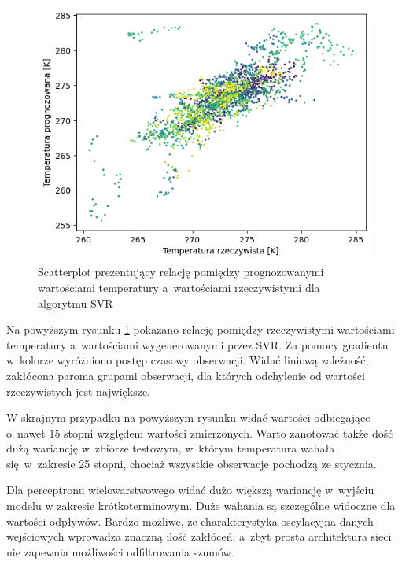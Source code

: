 \begin{figure}[H]
    \centering
    \includegraphics[width=\textwidth]{images/svr_real.png}
    \caption[Scatterplot dla SVR]{Scatterplot prezentujący relację pomiędzy prognozowanymi wartościami
    temperatury a~wartościami rzeczywistymi dla algorytmu SVR}
    \label{svr-real}
\end{figure}

Na powyższym rysunku \ref{svr-real} pokazano relację pomiędzy rzeczywistymi wartościami
temperatury a~wartościami wygenerowanymi przez SVR. Za pomocy gradientu w~kolorze wyróżniono postęp
czasowy obserwacji. Widać liniową zależność, zakłócona paroma grupami obserwacji, dla których
odchylenie od wartości rzeczywistych jest największe.

W skrajnym przypadku na powyższym rysunku widać wartości odbiegające o~nawet 15 stopni względem
wartości zmierzonych. Warto zanotować także dość dużą wariancję w~zbiorze testowym, w~którym
temperatura wahała się w~zakresie 25 stopni, chociaż wszystkie obserwacje pochodzą ze stycznia.

\pagebreak

Dla perceptronu wielowarstwowego widać dużo większą wariancję w~wyjściu modelu 
w zakresie krótkoterminowym. Duże wahania są szczególne widoczne dla wartości odpływów.
Bardzo możliwe, że charakterystyka oscylacyjna danych wejściowych wprowadza znaczną
ilość zakłóceń, a~zbyt prosta architektura sieci nie zapewnia możliwości odfiltrowania 
szumów. 

